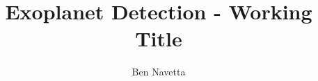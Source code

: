 \usepackage{hyperref}
\usepackage{mathtools}
\usepackage{nth}
\usepackage{siunitx}
\usepackage{wasysym}

\DeclareSIUnit[number-unit-product = \text{ }]
\DeclareSIUnit{}
\DeclareSIUnit[number-unit-product = \text{ }]
\DeclareSIUnit[number-unit-product = \text{ }]

\usepackage[backend=biber, style=phys]{biblatex}


\author{Ben Navetta}
\title{Exoplanet Detection - Working Title}

